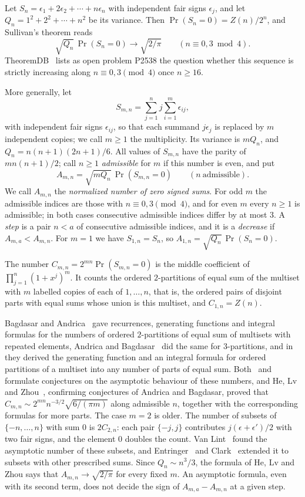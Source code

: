 \documentclass[11pt]{article}
\theoremstyle{remark}
\begin{document}
Let $S_n=\epsilon_1+2\epsilon_2+\cdots+n\epsilon_n$ with independent fair signs $\epsilon_j$, and let $Q_n=1^2+2^2+\cdots+n^2$ be its variance. Then $\Pr(S_n=0)=Z(n)/2^n$, and Sullivan's theorem reads
\[
\sqrt{Q_n}\,\Pr(S_n=0)\to\sqrt{2/\pi}\qquad(n\equiv0,3\bmod 4).
\]
TheoremDB~\cite{TDB} lists as open problem P2538 the question whether this sequence is strictly increasing along $n\equiv0,3\pmod4$ once $n\ge16$.

More generally, let
\[
S_{m,n}=\sum_{j=1}^n j\sum_{i=1}^m\epsilon_{ij},
\]
with independent fair signs $\epsilon_{ij}$, so that each summand $j\epsilon_j$ is replaced by $m$ independent copies; we call $m\ge1$ the multiplicity. Its variance is $mQ_n$, and $Q_n=n(n+1)(2n+1)/6$. All values of $S_{m,n}$ have the parity of $mn(n+1)/2$; call $n\ge1$ \emph{admissible} for $m$ if this number is even, and put
\[
A_{m,n}=\sqrt{mQ_n}\,\Pr(S_{m,n}=0)\qquad(n\ \text{admissible}).
\]
We call $A_{m,n}$ the \emph{normalized number of zero signed sums}. For odd $m$ the admissible indices are those with $n\equiv0,3\pmod4$, and for even $m$ every $n\ge1$ is admissible; in both cases consecutive admissible indices differ by at most $3$. A \emph{step} is a pair $n<a$ of consecutive admissible indices, and it is a \emph{decrease} if $A_{m,a}<A_{m,n}$. For $m=1$ we have $S_{1,n}=S_n$, so $A_{1,n}=\sqrt{Q_n}\,\Pr(S_n=0)$.

The number $C_{m,n}=2^{mn}\Pr(S_{m,n}=0)$ is the middle coefficient of $\prod_{j=1}^n(1+x^j)^m$. It counts the ordered $2$-partitions of equal sum of the multiset with $m$ labelled copies of each of $1,\dots,n$, that is, the ordered pairs of disjoint parts with equal sums whose union is this multiset, and $C_{1,n}=Z(n)$.

Bagdasar and Andrica~\cite{BA17} gave recurrences, generating functions and integral formulas for the numbers of ordered $2$-partitions of equal sum of multisets with repeated elements, Andrica and Bagdasar~\cite{AB18} did the same for $3$-partitions, and in~\cite{AB21} they derived the generating function and an integral formula for ordered partitions of a multiset into any number of parts of equal sum. Both~\cite{BA17} and~\cite{AB21} formulate conjectures on the asymptotic behaviour of these numbers, and He, Lv and Zhou~\cite{HLZ23}, confirming conjectures of Andrica and Bagdasar, proved that $C_{m,n}\sim2^{mn}n^{-3/2}\sqrt{6/(\pi m)}$ along admissible $n$, together with the corresponding formulas for more parts. The case $m=2$ is older. The number of subsets of $\{-n,\dots,n\}$ with sum $0$ is $2C_{2,n}$: each pair $\{-j,j\}$ contributes $j(\epsilon+\epsilon')/2$ with two fair signs, and the element $0$ doubles the count. Van Lint~\cite{vL67} found the asymptotic number of these subsets, and Entringer~\cite{Ent68} and Clark~\cite{Cla00} extended it to subsets with other prescribed sums. Since $Q_n\sim n^3/3$, the formula of He, Lv and Zhou says that $A_{m,n}\to\sqrt{2/\pi}$ for every fixed $m$. An asymptotic formula, even with its second term, does not decide the sign of $A_{m,a}-A_{m,n}$ at a given step.
\end{document}
